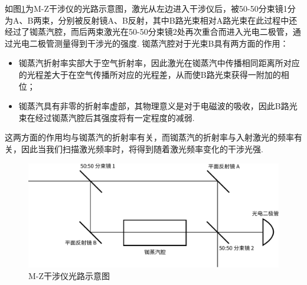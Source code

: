 \documentclass[a4paper, 10pt]{article}
\begin{document}
\begin{multicols}{2}
如图\ref{M-Z}为M-Z干涉仪的光路示意图，激光从左边进入干涉仪后，被50-50分束镜1分为A、B两束，分别被反射镜A、B反射，其中B路光束相对A路光束在此过程中还经过了铷蒸汽腔，而后两束激光在50-50分束镜2处再次重合而进入光电二极管，通过光电二极管测量得到干涉光的强度. 铷蒸汽腔对于光束B具有两方面的作用：
\begin{itemize}
    \item 铷蒸汽折射率实部大于空气折射率，因此激光在铷蒸汽中传播相同距离所对应的光程差大于在空气传播所对应的光程差，从而使B路光束获得一附加的相位；
    \item 铷蒸汽具有非零的折射率虚部，其物理意义是对于电磁波的吸收，因此B路光束在经过铷蒸汽腔后其强度将有一定程度的减弱.
\end{itemize}
这两方面的作用均与铷蒸汽的折射率有关，而铷蒸汽的折射率与入射激光的频率有关，因此当我们扫描激光频率时，将得到随着激光频率变化的干涉光强.
\begin{figure}[H]
    \centering
    \includegraphics[width=.9\columnwidth]{M-Z-Interferometer.pdf}
    \caption{M-Z干涉仪光路示意图}
    \label{M-Z}
\end{figure}


\end{multicols}
\end{document}
